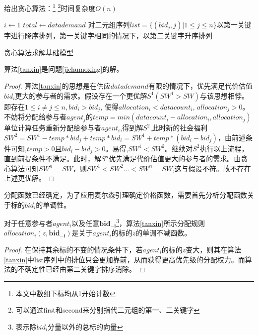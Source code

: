 \documentclass[promaster]{thesis-uestc}
\begin{document}
给出贪心算法：\footnote{本文中数组下标均从1开始计数}
\footnote{可以通过first和second来分别指代二元组的第一、二关键字}时间复杂度$O(n)$

\begin{algorithm}[H] 
    $i \leftarrow 1$\;
    $total \leftarrow datademand $\;
    对二元组序列$list = \{(bid_j,j)|1 \leq j \leq n\}$以第一关键字进行降序排列，第一关键字相同的情况下，以第二关键字升序排列\;
\caption{贪心算法求解基础模型}
\label{tanxin}
\end{algorithm}

\begin{theorem}
算法\ref{tanxin}是问题\ref{jichumoxing}的解。
\end{theorem}

\begin{proof}
    算法\ref{tanxin}的思想是在供应$datademand$有限的情况下，优先满足代价估值$bid_i$更大的参与者的需求。假设存在一个更优解$S^1(SW^1 > SW)$与该思想相悖。即存在$1 \leq i \neq j \leq n,bid_i > bid_j$, 使得$allocation_i < datacount_i \text{, } allocation_j > 0$。不妨将分配给参与者$agent_j$的$temp = min(datacount_i - allocation_i,allocation_j)$单位计算任务重新分配给参与者$agent_i$,得到解$S^2$,此时新的社会福利$SW^2= SW^1- temp*bid_j + temp*bid_i=SW^1+temp*(bid_i-bid_j)$，由前述条件可知,$temp > 0$且$bid_i - bid_j > 0$。易得,$SW^1<SW^2 $。继续对$S^2$执行以上流程，直到前提条件不满足。此时，解$S^n$优先满足代价估值更大的参与者的需求。由贪心算法可知$SW^n = SW$，则$SW^1<SW^2...<SW^n=SW$,这与假设不符。故不存在上述更优解。
\end{proof}

分配函数已经确定，为了应用麦尔森引理确定价格函数，需要首先分析分配函数关于标的$bid_i$的单调性。

\begin{theorem}
    对于任意参与者$agent_i$以及任意$\mathbf{bid_{-i}}$\footnote{表示除$bid_i$分量以外的总标的向量}，算法\ref{tanxin}所示分配规则$allocation_i(z,\mathbf{bid_{-i}})$是关于$agent_i$的标的$z$的单调不减函数。
\end{theorem}

\begin{proof}
   在保持其余标的不变的情况条件下，若$agent_i$的标的$z$变大，则其在算法\ref{tanxin}中list序列中的排位只会更加靠前，从而获得更高优先级的分配权力。而算法的不确定性已经由第二关键字排序消除。
\end{proof}
\end{document}
